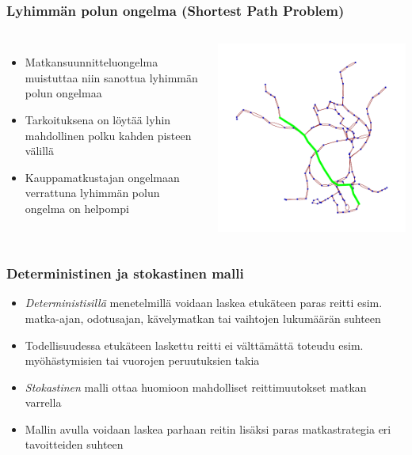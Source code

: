 \documentclass{beamer}
\begin{document}
\begin{frame}
 \frametitle{Lyhimmän polun ongelma (Shortest Path Problem)} 
 \begin{columns}
 \column{2.5in}
  \begin{itemize}
\item
Matkansuunnitteluongelma muistuttaa niin sanottua lyhimmän polun ongelmaa 
\item
Tarkoituksena on löytää lyhin mahdollinen polku kahden pisteen välillä
\item
Kauppamatkustajan ongelmaan verrattuna lyhimmän polun ongelma on helpompi
\end{itemize}
    \column{2.5in}
\centering

\includegraphics[scale=0.6]{shortestpathexample}
 
  \end{columns}

\end{frame}


\begin{frame}
  \frametitle{Deterministinen ja stokastinen malli} 
  \begin{itemize}
   \item 
    \emph{Deterministisillä} menetelmillä voidaan laskea etukäteen paras reitti esim. matka-ajan, odotusajan, kävelymatkan tai vaihtojen lukumäärän suhteen 
    \item
    Todellisuudessa etukäteen laskettu reitti ei välttämättä toteudu esim. myöhästymisien tai vuorojen peruutuksien takia
    \item
    \emph{Stokastinen} malli ottaa huomioon mahdolliset reittimuutokset matkan varrella
    \item
    Mallin avulla voidaan laskea parhaan reitin lisäksi paras matkastrategia eri tavoitteiden suhteen
   \end{itemize}
     \begin{center}
      \end{center}
\end{frame} 
\end{document}
